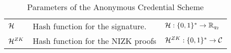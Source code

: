 \begin{table*}
\begin{center}
\begin{tabular}{lll}
		\midrule
		$\mathcal{H}$                                                  & Hash function for the
		signature.                                                  & $\mathcal{H} : \{0,1\}^*
		\rightarrow \mathbb{R}_{q_2}$        \\
		$\mathcal{H}^{ZK}$                                                    & Hash function for the
		NIZK proofs                                                 & $\mathcal{H}^{ZK} : \{0,1\}^*
		\rightarrow \mathcal{C}$          \\
	\end{tabular}
\end{center}
		\caption{\label{tab:parameters_ac_scheme}Parameters of the Anonymous Credential Scheme}
\end{table*}

\fi
